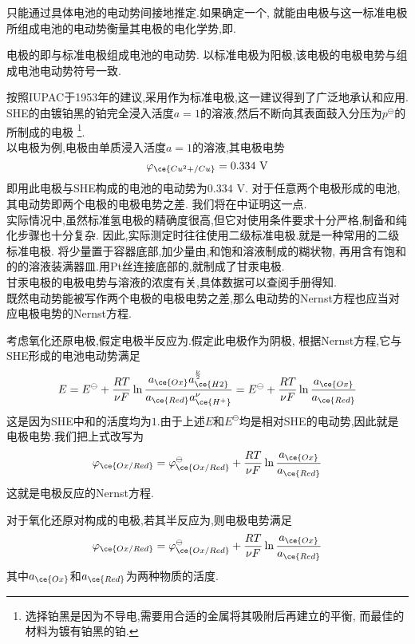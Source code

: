 \documentclass{ctexart}
\begin{document}
只能通过具体电池的电动势间接地推定.如果确定一个,%
就能由电极与这一标准电极所组成电池的电动势衡量其电极的电化学势,即.
\begin{definition}[6D.2.1 电极电势]
    电极的即与标准电极组成电池的电动势.%
    以标准电极为阳极,该电极的电极电势与组成电池电动势符号一致.
\end{definition}
按照IUPAC于1953年的建议,采用作为标准电极,这一建议得到了广泛地承认和应用.%
SHE的由镀铂黑的铂完全浸入活度$a=1$的溶液,然后不断向其表面鼓入分压为$p^\ominus$的所制成的电极%
\footnote{选择铂黑是因为不导电,需要用合适的金属将其吸附后再建立的平衡,%
而最佳的材料为镀有铂黑的铂.}.\\
\indent 以电极为例,电极由单质浸入活度$a=1$的溶液,其电极电势
\[\varphi_{\ce{Cu^2+/Cu}}=0.334\text{ V}\]
即用此电极与SHE构成的电池的电动势为$0.334\text{ V}$.%
对于任意两个电极形成的电池,其电动势即两个电极的电极电势之差.%
我们将在中证明这一点.\\
\indent 实际情况中,虽然标准氢电极的精确度很高,但它对使用条件要求十分严格,制备和纯化步骤也十分复杂.%
因此,实际测定时往往使用二级标准电极.就是一种常用的二级标准电极.%
将少量置于容器底部,加少量由,和饱和溶液制成的糊状物,%
再用含有饱和的的溶液装满器皿.用Pt丝连接底部的,就制成了甘汞电极.\\
\indent 甘汞电极的电极电势与溶液的浓度有关,具体数据可以查阅手册得知.\vspace{4pt}\\
\indent 既然电动势能被写作两个电极的电极电势之差,那么电动势的Nernst方程也应当对应电极电势的Nernst方程.
\begin{derivation}
    考虑氧化还原电极,假定电极半反应为.假定此电极作为阴极,%
    根据Nernst方程,它与SHE形成的电池电动势满足
    \[E=E^\ominus+\dfrac{RT}{\nu F}\ln\dfrac{a_{\ce{Ox}}a_{\ce{H2}}^{\frac\nu2}}{a_{\ce{Red}}a_{\ce{H^+}}^\nu}
    =E^\ominus+\dfrac{RT}{\nu F}\ln\dfrac{a_{\ce{Ox}}}{a_{\ce{Red}}}\]
    这是因为SHE中和的活度均为$1$.由于上述$E$和$E^\ominus$均是相对SHE的电动势,因此就是电极电势.我们把上式改写为
    \[\varphi_{\ce{Ox/Red}}=\varphi^\ominus_{\ce{Ox/Red}}+\dfrac{RT}{\nu F}\ln\dfrac{a_{\ce{Ox}}}{a_{\ce{Red}}}\]
    这就是电极反应的Nernst方程.
\end{derivation}
\begin{theorem}[6D.2.2 电极反应的Nernst方程]
    对于氧化还原对构成的电极,若其半反应为,则电极电势满足
    \[\varphi_{\ce{Ox/Red}}=\varphi^\ominus_{\ce{Ox/Red}}+\dfrac{RT}{\nu F}\ln\dfrac{a_{\ce{Ox}}}{a_{\ce{Red}}}\]
    其中$a_{\ce{Ox}}$和$a_{\ce{Red}}$为两种物质的活度.
\end{theorem}
\end{document}
